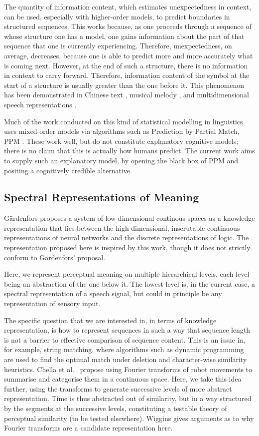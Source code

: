 \documentclass[runningheads]{llncs}
\begin{document}
The quantity of information content, which estimates unexpectedness in context, can be used, especially with higher-order models, to predict boundaries in structured sequences. This works because, as one proceeds through a sequence of whose structure one has a model, one gains information about the part of that sequence that one is currently experiencing. Therefore, unexpectedness, on average, decreases, because one is able to predict more and more accurately what is coming next. However, at the end of such a structure, there is no information in context to carry forward. Therefore, information content of the symbol at the start of a structure is usually greater than the one before it.
This phenomenon has been demonstrated in Chinese text \cite{SproatShihEtAl94}, musical melody \citep{PearceMullensiefenEtAl10}, and multidimensional speech representations  \citep{Wiggins10a}.

Much of the work conducted on this kind of statistical modelling in linguistics uses mixed-order models via algorithms such as Prediction by Partial Match, PPM \citep{ClearyWitten84}. These work well, but do not constitute explanatory cognitive models; there is no claim that this is actually how humans predict. The current work aims to supply such an explanatory model, by opening the black box of PPM and positing a cognitively credible alternative.

\subsection{Spectral Representations of Meaning}
G\"ardenfors \cite{Gardenfors00,Gardenfors14} proposes a system of low-dimensional continous spaces as a knowledge representation that lies between the high-dimensional, inscrutable continuous representations of neural networks and the discrete representations of logic. The representation proposed here is inspired by this work, though it does not strictly conform to G\"ardenfors' proposal.

Here, we represent perceptual meaning on multiple hierarchical levels, each level being an abstraction of the one below it. The lowest level is, in the current case, a spectral representation of a speech signal, but could in principle be any representation of sensory input.

The specific question that we are interested in, in terms of knowledge representation, is how to represent sequences in such a way that sequence length is not a barrier to effective comparison of sequence content. This is an issue in, for example, string matching, where algorithms such as dynamic programming are used to find the optimal match under deletion and character-wise similarity heuristics. Chella et al.~\citep{ChellaDindoEtAl07} propose using Fourier transforms of robot movements to summarise and categorise them in a continuous space. Here, we take this idea further, using the transforms to generate successive levels of more abstract representation. Time is thus abstracted out of similarity, but in a way structured by the segments at the successive levels, constituting a testable theory of perceptual similarity (to be tested elsewhere).
Wiggins \cite[][\S7.2.5]{Wiggins18} gives arguments as to why Fourier transforms are a candidate representation here.
\end{document}
